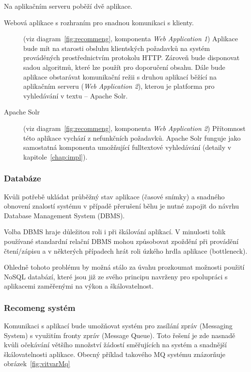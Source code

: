 \documentclass[thesis=M,czech]{FITthesis}[2014/05/07]
\begin{document}
Na aplikačním serveru poběží dvě aplikace. 

\begin{description}
	\item[Webová aplikace s rozhraním pro snadnou komunikaci s klienty.]
	(viz diagram~\ref{fig:recommeng}, komponenta \emph{Web Application 1}) Aplikace bude mít na starosti obsluhu klientských požadavků na systém prováděných prostřednictvím protokolu HTTP. Zároveň bude disponovat sadou algoritmů, které lze použít pro doporučení obsahu. Dále bude aplikace obstarávat komunikační režii s druhou aplikací běžící na aplikačním serveru (\emph{Web Application 2}), kterou je platforma pro vyhledávání v textu – Apache Solr.

	\item[Apache Solr]
	(viz diagram~\ref{fig:recommeng}, komponenta \emph{Web Application 2}) Přítomnost této aplikace vychází z nefunkčních požadavků. Apache Solr funguje jako samostatná komponenta umožňující fulltextové vyhledávání (detaily v kapitole~\ref{chap:impl}).
\end{description}

\subsubsection{Databáze}

Kvůli potřebě ukládat průběžný stav aplikace (časové snímky) a snadného obnovení znalostí systému v případě přerušení běhu je nutné zapojit do návrhu Database Management System (DBMS).

Volba DBMS hraje důležitou roli i při škálování aplikací. V minulosti tolik používané standardní relační DBMS mohou způsobovat zpoždění při provádění čtení/zápisu a v některých případech hrát roli úzkého hrdla aplikace (bottleneck).

Ohledně tohoto problému by možná stálo za úvahu prozkoumat možnosti použití NoSQL databází, které jsou již ze svého principu navrženy pro spolupráci s aplikacemi zaměřenými na výkon a škálovatelnost.

\subsubsection{Recomeng systém}

Komunikaci s aplikací bude umožňovat systém pro zasílání zpráv (Messaging System) s využitím fronty zpráv (Message Queue). Toto řešení je zde nasnadě kvůli očekávání většího množství žádostí směřujících na systém a snadnější škálovatelnosti aplikace. Obecný příklad takového MQ systému znázorňuje obrázek~\ref{fig:vitvarMq}
\end{document}
